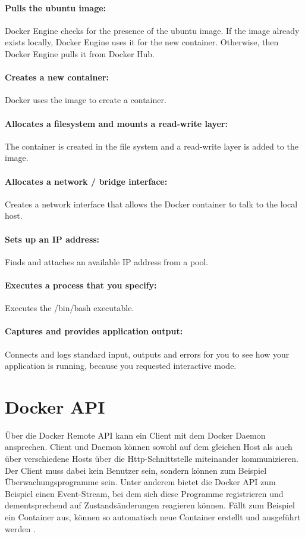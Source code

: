 \paragraph{Pulls the ubuntu image:} Docker Engine checks for the presence of the ubuntu image. If the image already exists locally, Docker Engine uses it for the new container. Otherwise, then Docker Engine pulls it from Docker Hub.

\paragraph{Creates a new container:} Docker uses the image to create a container.

\paragraph{Allocates a filesystem and mounts a read-write layer:} The container is created in the file system and a read-write layer is added to the image.

\paragraph{Allocates a network / bridge interface:} Creates a network interface that allows the Docker container to talk to the local host.

\paragraph{Sets up an IP address:} Finds and attaches an available IP address from a pool.

\paragraph{Executes a process that you specify:} Executes the /bin/bash executable.

\paragraph{Captures and provides application output:} Connects and logs standard input, outputs and errors for you to see how your application is running, because you requested interactive mode.


\section{Docker API}
Über die Docker Remote API kann ein Client mit dem Docker Daemon ansprechen. Client und Daemon können sowohl auf dem gleichen Host als auch über verschiedene Hosts über die Http-Schnittstelle miteinander kommunizieren. Der Client muss dabei kein Benutzer sein, sondern können zum Beispiel Überwachungsprogramme sein. Unter anderem bietet die Docker API zum Beispiel einen Event-Stream, bei dem sich diese Programme registrieren und dementsprechend auf Zustandsänderungen reagieren können. Fällt zum Beispiel ein Container aus, können so automatisch neue Container erstellt und ausgeführt werden \cite{docker:api}.\\

